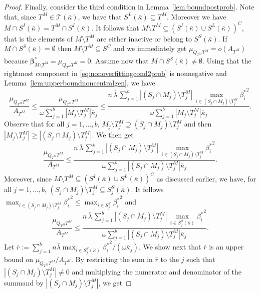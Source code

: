 \documentclass[
  12pt]{article}
\newcommand{\T}{\mathcal{T}}
\newcommand{\bbeta}{\boldsymbol{\beta}}
\begin{document}
\begin{proof}
Finally, consider the third condition in Lemma~\ref{lem:boundpostprob}. Note that, since $T^M\in\T(\bar{\kappa})$, we have that $S^L(\bar{\kappa})\subseteq T^M$. Moreover we have $M\cap S^{I}(\bar{\kappa})=T^M\cap S^{I}(\bar{\kappa})$. It follows that $M\setminus T^M\subseteq (S^{I}(\bar{\kappa}) \cup S^L(\bar{\kappa}))^C$, that is the elements of $M\setminus T^M$ are either inactive or belong to $S^S(\bar{\kappa})$. If $M\cap S^{S}(\bar{\kappa})=\emptyset$ then $M\setminus T^M\subseteq S^C$ and we immediately get $\mu_{Q_{T^M} T^M}=o(A_{T^M})$ because $\bbeta^*_{M \setminus T^M}=\mu_{Q_{T^M} T^M}=0$. Assume now that $M\cap S^{S}(\bar{\kappa})\neq\emptyset$. Using that the rightmost component in \eqref{eq:nonoverfittingcond2prob} is nonnegative and Lemma~\ref{lem:upperboundnoncentralgen}, we have
$$\frac{\mu_{Q_{T^M} T^M}}{ A_{T^M}} \leq \frac{\mu_{Q_{T^M} T^M}}{ \omega\sum_{j=1}^b|M_j \setminus T^M_j|\bar{\kappa}_j} \leq \frac{n\,\bar{\lambda}\,\sum_{j=1}^b|(S_j\cap M_j )\setminus T^M_j|\,\max_{i\in (S_j\cap M_j )\setminus T^M_j}{\beta_{i}^*}^2}{ \omega\sum_{j=1}^b|M_j \setminus T^M_j|\bar{\kappa}_j}.$$
Observe that for all $j=1,\ldots,b$, $M_j \setminus T^M_j \supseteq (S_j\cap M_j )\setminus T^M_j$ and then $|M_j \setminus T^M_j| \geq |(S_j\cap M_j )\setminus T^M_j|$. We then get
$$\frac{\mu_{Q_{T^M} T^M}}{ A_{T^M}} \leq \frac{n\,\bar{\lambda}\,\sum_{j=1}^b|(S_j\cap M_j )\setminus T^M_j|\,\max_{i\in(S_j\cap M_j )\setminus T^M_j}{\beta_{i}^*}^2}{ \omega\sum_{j=1}^b|(S_j\cap M_j ) \setminus T^M_j|\bar{\kappa}_j}.$$
Moreover, since  $M\setminus T^M\subseteq (S^{I}(\bar{\kappa}) \cup S^L(\bar{\kappa}))^C$ as discussed earlier, we have, for all $j=1,\ldots,b$, $(S_j\cap M_j )\setminus T^M_j \subseteq S^{S}_j(\bar{\kappa})$. It follows $\max_{i\in(S_j\cap M_j )\setminus T^M_j}{\beta_{i}^*}^2 \leq \max_{i\in S_j^S}{\beta_{i}^*}^2$ and
\begin{equation}\label{eq:onbfsaprob}
  \frac{\mu_{Q_{T^M} T^M}}{ A_{T^M}} \leq \frac{n\,\bar{\lambda}\,\sum_{j=1}^b|(S_j\cap M_j )\setminus T^M_j|\,\max_{i\in S^{S}_j(\bar{\kappa})}{\beta_{i}^*}^2}{ \omega\sum_{j=1}^b|(S_j\cap M_j ) \setminus T^M_j|\bar{\kappa}_j}.  
\end{equation}
Let $\bar{r}:=\sum_{j=1}^b n\bar{\lambda}\max_{i\in S^{S}_j(\bar{\kappa})}{\beta_i^*}^2/(\omega\bar{\kappa}_j)$. We show next that $\bar{r}$ is an upper bound on $\mu_{Q_{T^M} T^M}/ A_{T^M}$. By restricting the sum in $\bar{r}$ to the $j$ such that $|(S_j\cap M_j )\setminus T^M_j|\neq 0$ and multiplying the numerator and denominator of the summand by $|(S_j\cap M_j )\setminus T^M_j|$, we get 

\end{proof}
\end{document}
